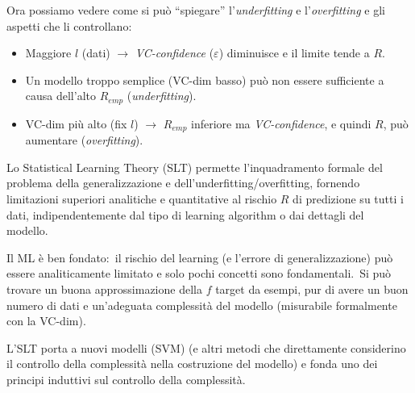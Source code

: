 \noindent Ora possiamo vedere come si può ``spiegare'' l'\textit{underfitting} e l'\textit{overfitting} e gli aspetti che li controllano:

\begin{itemize}
	\item Maggiore $l$ (dati) $\rightarrow$ \textit{VC-confidence} ($\varepsilon$) diminuisce e il limite tende a $R$.
	\item Un modello troppo semplice (VC-dim basso) può non essere sufficiente a causa dell'alto $R_{emp}$ (\textit{underfitting}).
	\item VC-dim più alto (fix $l$) $\rightarrow$ $R_{emp}$ inferiore ma \textit{VC-confidence}, e quindi $R$, può aumentare (\textit{overfitting}).
\end{itemize}

\noindent Lo Statistical Learning Theory (SLT) permette l'inquadramento formale del problema della generalizzazione e dell'underfitting{\slash}overfitting, fornendo limitazioni superiori analitiche e quantitative al rischio $R$ di predizione su tutti i dati, indipendentemente dal tipo di learning algorithm o dai dettagli del modello.\

Il ML è ben fondato:\ il rischio del learning (e l'errore di generalizzazione) può essere analiticamente limitato e solo pochi concetti sono fondamentali.\
Si può trovare un buona approssimazione della $f$ target da esempi, pur di avere un buon numero di dati e un'adeguata complessità del modello (misurabile formalmente con la VC-dim).\

L'SLT porta a nuovi modelli (SVM) (e altri metodi che direttamente considerino il controllo della complessità nella costruzione del modello) e fonda uno dei principi induttivi sul controllo della complessità.\
